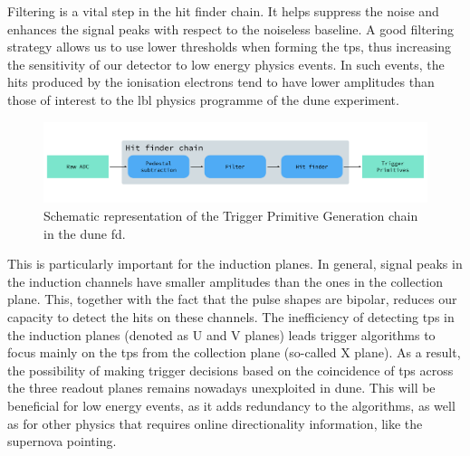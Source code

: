 Filtering is a vital step in the hit finder chain. It helps suppress the noise and enhances the signal peaks with respect to the noiseless baseline. A good filtering strategy allows us to use lower thresholds when forming the \gls{tp}s, thus increasing the sensitivity of our detector to low energy physics events. In such events, the hits produced by the ionisation electrons tend to have lower amplitudes than those of interest to the \gls{lbl} physics programme of the \gls{dune} experiment.

\begin{figure}[t]
	\centering
	\includegraphics[width=0.99\linewidth]{Images/Matched_Filter/trigger_primitive_chain.pdf}
	\caption{Schematic representation of the Trigger Primitive Generation chain in the \gls{dune} \gls{fd}.}
	\label{fig:tpg_chain}
\end{figure}

This is particularly important for the induction planes. In general, signal peaks in the induction channels have smaller amplitudes than the ones in the collection plane. This, together with the fact that the pulse shapes are bipolar, reduces our capacity to detect the hits on these channels. The inefficiency of detecting \gls{tp}s in the induction planes (denoted as U and V planes) leads trigger algorithms to focus mainly on the \gls{tp}s from the collection plane (so-called X plane). As a result, the possibility of making trigger decisions based on the coincidence of \gls{tp}s across the three readout planes remains nowadays unexploited in \gls{dune}. This will be beneficial for low energy events, as it adds redundancy to the algorithms, as well as for other physics that requires online directionality information, like the supernova pointing.

